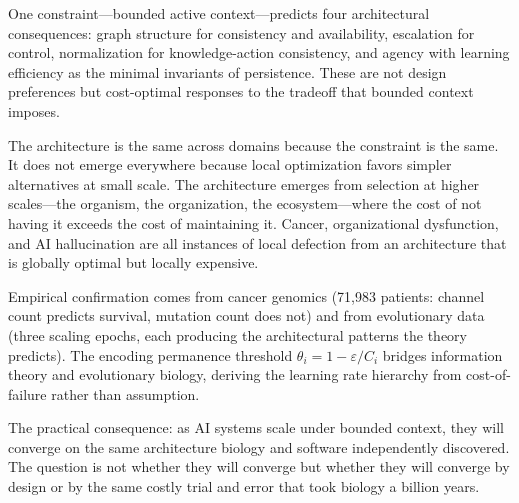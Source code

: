\documentclass[11pt]{article}
\theoremstyle{definition}
\theoremstyle{remark}
\begin{document}
One constraint---bounded active context---predicts four architectural
consequences: graph structure for consistency and availability,
escalation for control, normalization for knowledge-action consistency,
and agency with learning efficiency as the minimal invariants of
persistence. These are not design preferences but cost-optimal
responses to the tradeoff that bounded context imposes.

The architecture is the same across domains because the constraint is
the same. It does not emerge everywhere because local optimization
favors simpler alternatives at small scale. The architecture emerges
from selection at higher scales---the organism, the organization, the
ecosystem---where the cost of not having it exceeds the cost of
maintaining it. Cancer, organizational dysfunction, and AI
hallucination are all instances of local defection from an
architecture that is globally optimal but locally expensive.

Empirical confirmation comes from cancer genomics (71,983 patients:
channel count predicts survival, mutation count does not) and from
evolutionary data (three scaling epochs, each producing the
architectural patterns the theory predicts). The encoding permanence
threshold $\theta_i = 1 - \varepsilon / C_i$ bridges information
theory and evolutionary biology, deriving the learning rate hierarchy
from cost-of-failure rather than assumption.

The practical consequence: as AI systems scale under bounded context,
they will converge on the same architecture biology and software
independently discovered. The question is not whether they will
converge but whether they will converge by design or by the same
costly trial and error that took biology a billion years.



\end{document}
